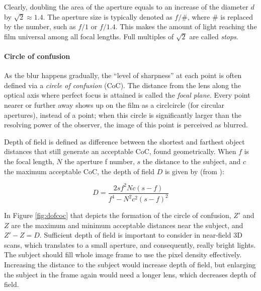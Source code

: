 Clearly, doubling the area of the aperture equals to an increase of the diameter $d$ by $\sqrt 2 \approx 1.4$.
The aperture size is typically denoted as $f/\#$, where $\#$ is replaced by the number, such as $f/1$ or $f/1.4$.
This makes the amount of light reaching the film universal among all focal lengths.
Full multiples of $\sqrt 2$ are called \emph{stops}.
\cite{szeliski10vision}

\paragraph{Circle of confusion}
As the blur happens gradually, the ``level of sharpness'' at each point is often defined via a \emph{circle of confusion} (CoC).
The distance from the lens along the optical axis where perfect focus is attained is called the \emph{focal plane}.
Every point nearer or further away shows up on the film as a circlcircle (for circular apertures), instead of a point; when this circle is significantly larger than the resolving power of the observer, the image of this point is perceived as blurred.
\cite{szeliski10vision,greenleaf1950photographic}

Depth of field is defined as difference between the shortest and farthest object distances that still generate an acceptable CoC, found geometrically.
When $f$ is the focal length, $N$ the aperture f number, $s$ the distance to the subject, and $c$ the maximum acceptable CoC, the depth of field $D$ is given by (from \cite{greenleaf1950photographic}):

\begin{equation} \label{eq:dof}
	D = \frac{2 s f^2 N c (s - f)} {f^4 - N^2 c^2 (s - f)^2}
\end{equation}



In Figure \ref{fig:dofcoc} that depicts the formation of the circle of confusion, $Z'$ and $Z$ are the maximum and minimum acceptable distances near the subject, and $Z' - Z = D$.
Sufficient depth of field is important to consider in near-field 3D scans, which translates to a small aperture, and consequently, really bright lights.
The subject should fill whole image frame to use the pixel density effectively.
Increasing the distance to the subject would increase depth of field, but enlarging the subject in the frame again would need a longer lens, which decreases depth of field.

